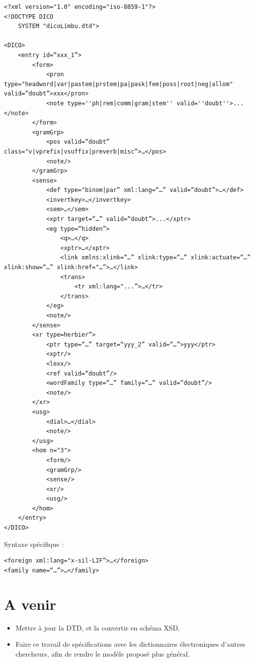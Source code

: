 \documentclass[a4paper,12pt]{article}
\begin{document}
\begin{lstlisting}[caption=Limbu example]
<?xml version="1.0" encoding="iso-8859-1"?>
<!DOCTYPE DICO
	SYSTEM "dicoLimbu.dtd">

<DICO>
	<entry id=“xxx_1”>
		<form>
			<pron type="headword|var|pastem|prstem|pa|pask|fem|poss|root|neg|allom" valid=“doubt”>xxx</pron>
			<note type=''ph|rem|comm|gram|stem'' valid=''doubt''>...</note>
		</form>
		<gramGrp>
			<pos valid=“doubt” class="v|vprefix|vsuffix|preverb|misc”>…</pos>
			<note/>
		</gramGrp>
		<sense>
			<def type="binom|par” xml:lang=“…” valid=“doubt”>…</def>
			<invertkey>…</invertkey>
			<sem>…</sem>
			<xptr target=“…” valid=“doubt”>...</xptr>
			<eg type=“hidden”>
				<q>…</q>
				<xptr>…</xptr>
				<link xmlns:xlink=“…” xlink:type=“…” xlink:actuate=“…” xlink:show=“…” xlink:href="…”>…</link>
				<trans>
					<tr xml:lang="...”>…</tr>
				</trans>
			</eg>
			<note/>
		</sense>
		<xr type=herbier”>
			<ptr type=“…” target=“yyy_2” valid=“…”>yyy</ptr>
			<xptr/>
			<lexx/>
			<ref valid=“doubt”/>
			<wordFamily type=“…” family=“…” valid=“doubt”/>
			<note/>
		</xr>
		<usg>
			<dial>…</dial>
			<note/>
		</usg>
		<hom n="3">
			<form/>
			<gramGrp/>
			<sense/>
			<xr/>
			<usg/>
		</hom>
	</entry>
</DICO>
\end{lstlisting}

Syntaxe spécifique :
\begin{lstlisting}[caption=Limbu syntax]
<foreign xml:lang="x-sil-LIF”>…</foreign>
<family name=“…”>…</family>
\end{lstlisting}

\section{A venir}

\begin{itemize}
\item Mettre \`a jour la DTD, et la convertir en sch\'ema XSD.
\item Faire ce travail de sp\'ecifications avec les dictionnaires \'electroniques d'autres chercheurs, afin de rendre le mod\`ele propos\'e plus g\'en\'eral.
\end{itemize}
\end{document}
